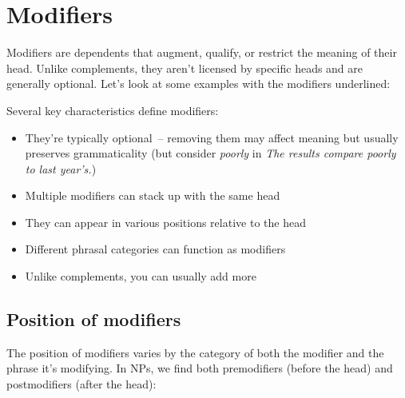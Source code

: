 \section{Modifiers} \label{sec:modifiers}

Modifiers are dependents that augment, qualify, or restrict the meaning of their head. Unlike complements, they aren't licensed by specific heads and are generally optional. Let's look at some examples with the modifiers underlined:

\ea\label{ex:modifier-types}
   \z
\z

Several key characteristics define modifiers:

\begin{itemize}[noitemsep]
   \item They're typically optional~-- removing them may affect meaning but usually preserves grammaticality (but consider \textit{poorly} in \textit{The results compare poorly to last year's.})
   \item Multiple modifiers can stack up with the same head
   \item They can appear in various positions relative to the head
   \item Different phrasal categories can function as modifiers
   \item Unlike complements, you can usually add more 
\end{itemize}

\subsection{Position of modifiers}

The position of modifiers varies by the category of both the modifier and the phrase it's modifying. In NPs, we find both premodifiers (before the head) and postmodifiers (after the head):

\ea\label{ex:np-modifiers}
   \z
\z

